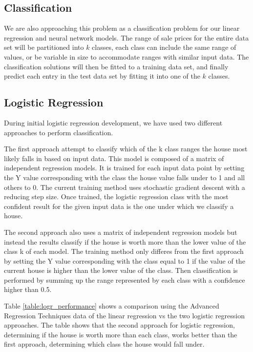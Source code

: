 \documentclass[10pt]{article}
\begin{document}
\begin{multicols}{2}
 		\subsection{Classification}
			We are also approaching this problem as a classification problem for our linear regression and neural network models. The range of sale prices for the entire data set will be partitioned into \(k\) classes, each class can include the same range of values, or be variable in size to accommodate ranges with similar input data. The classification solutions will then be fitted to a training data set, and finally predict each entry in the test data set by fitting it into one of the \(k\) classes.
		\subsection{Logistic Regression}
			During initial logistic regression development, we have used two different approaches to perform classification.
		\par
			The first approach attempt to classify which of the k class ranges the house most likely falls in based on input data. This model is composed of a matrix of independent regression models. It is trained for each input data point by setting the Y value corresponding with the class the house value falls under to 1 and all others to 0. The current training method uses stochastic gradient descent with a reducing step size. Once trained, the logistic regression class with the most confident result for the given input data is the one under which we classify a house.
		\par
	 		The second approach also uses a matrix of independent regression models but instead the results classify if the house is worth more than the lower value of the class k of each model. The training method only differes from the first approach by setting the Y value corresponding with the class equal to 1 if the value of the current house is higher than the lower value of the class. Then classification is performed by summing up the range represented by each class with a confidence higher than 0.5.
		\par
 			Table \ref{table:logr_performance} shows a comparison using the Advanced Regression Techniques data of the linear regression vs the two logistic regression approaches. The table shows that the second approach for logistic regression, determining if the house is worth more than each class, works better than the first approach, determining which class the house would fall under.

\end{multicols}
\end{document}
